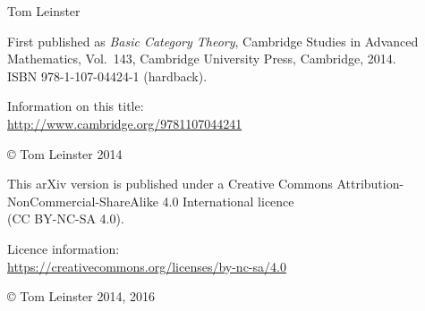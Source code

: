 % 
% 
% 

\thispagestyle{empty}

{%
\vspace*{\fill}

\hfill
{}

\vspace*{2em}
\hfill
{\large Tom Leinster}

}


\newpage
\thispagestyle{empty}

{\centering\small

First published as \emph{Basic Category Theory}, Cambridge Studies in
Advanced Mathematics, Vol.~143, Cambridge University Press, Cambridge,
2014.\\  
ISBN 978-1-107-04424-1 (hardback).

\bigskip

Information on this title:\\
\href{http://www.cambridge.org/9781107044241}{http://www.cambridge.org/9781107044241}
% 

\bigskip

\copyright{} Tom Leinster 2014


\vspace*{20mm}


This arXiv version is published under a Creative Commons
Attribution-NonCommercial-ShareAlike 4.0 International licence\\ 
(CC BY-NC-SA 4.0).

\bigskip

Licence information:\\
\href{https://creativecommons.org/licenses/by-nc-sa/4.0/}{https://creativecommons.org/licenses/by-nc-sa/4.0}

\bigskip

\copyright{} Tom Leinster 2014, 2016

}

